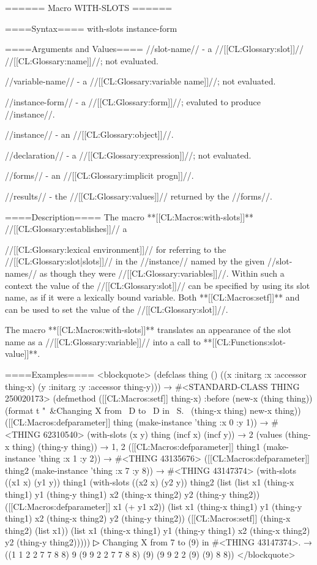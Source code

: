 ====== Macro WITH-SLOTS ======

====Syntax====
\DefmacWithValuesNewline with-slots { instance-form  } {}


====Arguments and Values====
//slot-name// - a //[[CL:Glossary:slot]]// //[[CL:Glossary:name]]//; not evaluated.

//variable-name// - a //[[CL:Glossary:variable name]]//; not evaluated.

//instance-form// - a //[[CL:Glossary:form]]//; evaluted to produce //instance//.

//instance// - an //[[CL:Glossary:object]]//.

//declaration// - a  //[[CL:Glossary:expression]]//; not evaluated.

//forms// - an //[[CL:Glossary:implicit progn]]//.

//results// - the //[[CL:Glossary:values]]// returned by the //forms//.

====Description====
The macro **[[CL:Macros:with-slots]]** //[[CL:Glossary:establishes]]// a

//[[CL:Glossary:lexical environment]]// for referring to the //[[CL:Glossary:slot|slots]]// in the //instance// named by the given //slot-names// as though they were //[[CL:Glossary:variables]]//. Within such a context the value of the //[[CL:Glossary:slot]]// can be specified by using its slot name, as if it were a lexically bound variable. Both **[[CL:Macros:setf]]** and  can be used to set the value of the //[[CL:Glossary:slot]]//.

The macro **[[CL:Macros:with-slots]]** translates an appearance of the slot name as a //[[CL:Glossary:variable]]// into a call to **[[CL:Functions:slot-value]]**.

====Examples====
<blockquote> (defclass thing () ((x :initarg :x :accessor thing-x) (y :initarg :y :accessor thing-y))) → #<STANDARD-CLASS THING 250020173> (defmethod ([[CL:Macros:setf]] thing-x) :before (new-x (thing thing)) (format t "~&Changing X from ~D to ~D in ~S.~ (thing-x thing) new-x thing)) ([[CL:Macros:defparameter]] thing (make-instance 'thing :x 0 :y 1)) → #<THING 62310540> (with-slots (x y) thing (incf x) (incf y)) → 2 (values (thing-x thing) (thing-y thing)) → 1, 2 ([[CL:Macros:defparameter]] thing1 (make-instance 'thing :x 1 :y 2)) → #<THING 43135676> ([[CL:Macros:defparameter]] thing2 (make-instance 'thing :x 7 :y 8)) → #<THING 43147374> (with-slots ((x1 x) (y1 y)) thing1 (with-slots ((x2 x) (y2 y)) thing2 (list (list x1 (thing-x thing1) y1 (thing-y thing1) x2 (thing-x thing2) y2 (thing-y thing2)) ([[CL:Macros:defparameter]] x1 (+ y1 x2)) (list x1 (thing-x thing1) y1 (thing-y thing1) x2 (thing-x thing2) y2 (thing-y thing2)) ([[CL:Macros:setf]] (thing-x thing2) (list x1)) (list x1 (thing-x thing1) y1 (thing-y thing1) x2 (thing-x thing2) y2 (thing-y thing2)))))
▷ Changing X from 7 to (9) in #<THING 43147374>. → ((1 1 2 2 7 7 8 8) 9 (9 9 2 2 7 7 8 8) (9) (9 9 2 2 (9) (9) 8 8)) </blockquote>

